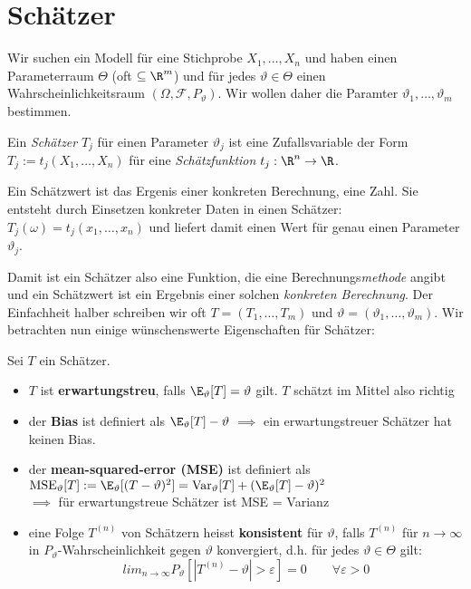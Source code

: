 \section{Schätzer}
\renewcommand{\theta}{\vartheta}
Wir suchen ein Modell für eine Stichprobe $X_1,\dots, X_n$ und haben einen Parameterraum $\Theta$ (oft $\subseteq \R^m$) und für jedes $\theta \in \Theta$ einen Wahrscheinlichkeitsraum $(\Omega, \mathcal{F}, P_\theta)$. Wir wollen daher die Paramter $\theta_1,\dots,\theta_m$ bestimmen.
\begin{definition}
Ein \textit{Schätzer} $T_j$ für einen Parameter $\theta_j$ ist eine Zufallsvariable der Form $T_j := t_j(X_1,\dots,X_n)$ für eine \textit{Schätzfunktion} $t_j: \R^n \to \R$.
\end{definition}
\begin{definition}
Ein Schätzwert ist das Ergenis einer konkreten Berechnung, eine Zahl. Sie entsteht durch Einsetzen konkreter Daten in einen Schätzer: $T_j(\omega) = t_j(x_1,\dots,x_n)$ und liefert damit einen Wert für genau einen Parameter $\theta_j$.
\end{definition}
Damit ist ein Schätzer also eine Funktion, die eine Berechnungs\textit{methode} angibt und ein Schätzwert ist ein Ergebnis einer solchen \textit{konkreten Berechnung}. Der Einfachheit halber schreiben wir oft $T = (T_1,\dots,T_m)$ und $\theta = (\theta_1,\dots,\theta_m)$. Wir betrachten nun einige wünschenswerte Eigenschaften für Schätzer:

\begin{definition}
Sei $T$ ein Schätzer.
\begin{itemize}
\item $T$ ist \textbf{erwartungstreu}, falls $\E_\theta [T] = \theta$ gilt. $T$ schätzt im Mittel also richtig
\item der \textbf{Bias} ist definiert als $\E_\theta [T] - \theta$
$\implies$ ein erwartungstreuer Schätzer hat keinen Bias.
\item der \textbf{mean-squared-error (MSE)} ist definiert als\\
$\mathrm{MSE}_\theta [T] := \E_\theta [(T-\theta)^2] = \mathrm{Var}_\theta[T] + (\E_\theta[T] - \theta)^2$\\
$\implies$ für erwartungstreue Schätzer ist MSE = Varianz
\item eine Folge $T^{(n)}$ von Schätzern heisst \textbf{konsistent} für $\theta$, falls $T^{(n)}$ für $n\to\infty$ in $P_\theta$-Wahrscheinlichkeit gegen $\theta$ konvergiert, d.h. für jedes $\theta \in \Theta$ gilt:
$$ lim_{n\to\infty} P_\theta \left[ |T^{(n)} - \theta | > \varepsilon\right] = 0 \quad \quad \forall \varepsilon >0$$
\end{itemize}
\end{definition}

